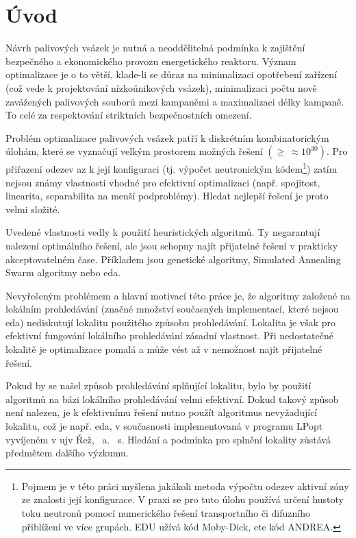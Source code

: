 \chapter*{Úvod} %
Návrh palivových vsázek je nutná a neoddělitelná podmínka k zajištění bezpečného a ekonomického provozu energetického reaktoru. 
Význam optimalizace je o to větší, klade-li se důraz na minimalizaci opotřebení zařízení (což vede k projektování 
nízkoúnikových vsázek), minimalizaci počtu nově zavážených palivových souborů mezi kampaněmi a maximalizaci 
délky kampaně. To celé za respektování striktních bezpečnostních omezení. 

Problém optimalizace palivových vsázek patří k diskrétním kombinatorickým úlohám, které se vyznačují 
velkým prostorem možných řešení $(\geq\,\approx 10^{30})$. Pro přiřazení odezev \ac{az} k její konfiguraci 
(tj. výpočet neutronickým kódem\footnote{Pojmem  je v této práci myšlena jakákoli metoda výpočtu 
odezev aktivní zóny ze znalosti její konfigurace. V praxi se pro tuto úlohu používá určení hustoty toku neutronů 
pomocí numerického řešení transportního či difuzního přiblížení ve více grupách. EDU užívá kód Moby-Dick, \ac{ete} kód ANDREA.}) 
zatím nejsou známy vlastnosti vhodné pro efektivní 
optimalizaci (např. spojitost, linearita, separabilita na menší podproblémy). 
Hledat nejlepší řešení je proto velmi složité. 

Uvedené vlastnosti vedly k použití heuristických algoritmů. Ty negarantují nalezení optimálního řešení, 
ale jsou schopny najít přijatelné řešení v prakticky akceptovatelném čase. Příkladem jsou genetické algoritmy, 
Simulated Annealing Swarm algoritmy nebo \ac{eda}. 

Nevyřešeným problémem a hlavní motivací této práce je, že algoritmy založené na lokálním prohledávání 
(značné množství současných implementací, které nejsou \ac{eda}) nediskutují lokalitu 
použitého způsobu prohledávání. Lokalita je však pro efektivní fungování lokálního prohledávání 
zásadní vlastnost. Při nedostatečné lokalitě je optimalizace pomalá a může vést až v nemožnost 
najít přijatelné řešení. 

Pokud by se našel způsob prohledávání splňující lokalitu, bylo by použití algoritmů na bázi lokálního 
prohledávání velmi efektivní. Dokud takový způsob není nalezen, je k efektivnímu řešení nutno 
použít algoritmus nevyžadující lokalitu, což je např. \ac{eda}, v současnosti implementovaná 
v programu LPopt vyvíjeném v \ac{ujv} Řež,~ a.~ s. Hledání a podmínka pro splnění lokality zůstává předmětem dalšího výzkumu. 


